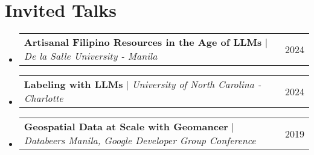 \documentclass[a4paper,11pt]{article}
\makeatletter
\newcommand{\resumeProjectHeading}[2]{
    \item
    \begin{tabular*}{0.97\textwidth}{l@{\extracolsep{\fill}}r}
      \small#1 & #2 \\
    \end{tabular*}\vspace{-7pt}
}
\newcommand{\resumeSubHeadingListStart}{\begin{itemize}[leftmargin=0.15in, label={}]}
\newcommand{\resumeSubHeadingListEnd}{\end{itemize}}
\makeatother
\begin{document}
\section{Invited Talks}
\resumeSubHeadingListStart
\resumeProjectHeading
{\textbf{Artisanal Filipino Resources in the Age of LLMs} $|$ \emph{De la Salle University - Manila}}{2024}
\resumeProjectHeading
{\textbf{Labeling with LLMs} $|$ \emph{University of North Carolina - Charlotte}}{2024}
\resumeProjectHeading
{\textbf{Geospatial Data at Scale with Geomancer} $|$ \emph{Databeers Manila, Google Developer Group Conference}}{2019}
\resumeSubHeadingListEnd


\newpage
\nocite{*}
{
  \small
  
  
}


\end{document}
